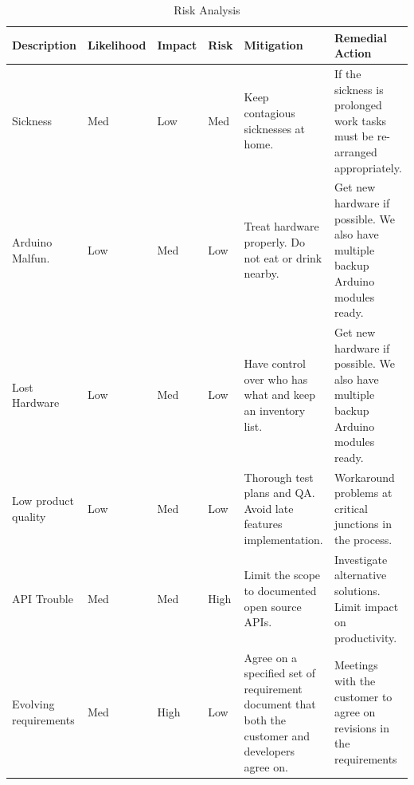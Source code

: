 \begin{table}
	\begin{center}
		\caption{Risk Analysis}
		\begin{tabular}{| l | l | l | l | p{2.8cm} | p{3cm} |}
		\hline

\textbf{Description} & \textbf{Likelihood} & \textbf{Impact} & \textbf{Risk} & \textbf{Mitigation} & \textbf{Remedial Action}\\ \hline

Sickness 			& Med & Low & Med & Keep contagious sicknesses at home.
					& If the sickness is prolonged work tasks must be re-arranged appropriately. \\ \hline


Arduino Malfun.		& Low & Med & Low & Treat hardware properly. Do not eat or drink nearby.
					&  Get new hardware if possible. We also have multiple backup Arduino modules ready. \\ \hline

Lost Hardware		& Low & Med & Low & Have control over who has what and keep an inventory list.
					& Get new hardware if possible. We also have multiple backup Arduino modules ready. \\ \hline

Low product quality		& Low & Med & Low & Thorough test plans  and QA. Avoid late features implementation.
					&  Workaround problems at critical junctions in the process.\\ \hline

API Trouble			& Med & Med & High & Limit the scope to documented open source APIs.
					& Investigate alternative solutions. Limit impact on productivity. \\ \hline

Evolving requirements	& Med & High & Low & Agree on a specified set of requirement document that both the customer and developers agree on.
					& Meetings with the customer to agree on revisions in the requirements \\ \hline

			

		\end{tabular}
	\end{center}	
	\label{table:riskanalysis}
\end{table}

